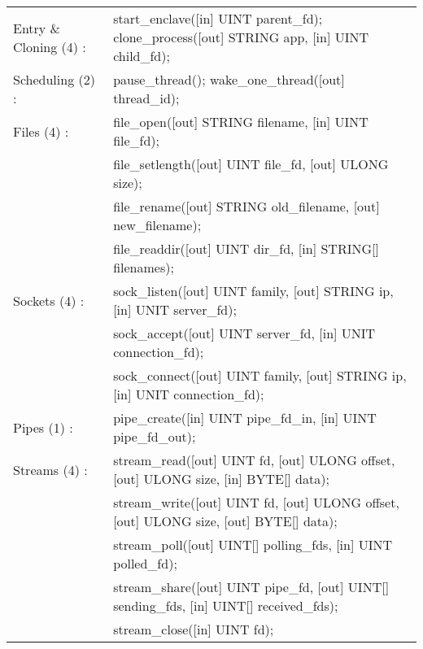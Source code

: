 \footnotesize
\begin{tabular}{>{\raggedleft\arraybackslash}p{.15\linewidth}>{\raggedright\arraybackslash\ttfamily}p{.85\linewidth}}
Entry \& Cloning (4) :
& start\_enclave([in] UINT parent\_fd); clone\_process([out] STRING app, [in] UINT child\_fd); \\
\addlinespace
Scheduling (2) :
& pause\_thread(); wake\_one\_thread([out] thread\_id); \\
\addlinespace
Files (4) :
& file\_open([out] STRING filename, [in] UINT file\_fd); \\
& file\_setlength([out] UINT file\_fd, [out] ULONG size); \\
& file\_rename([out] STRING old\_filename, [out] new\_filename); \\
& file\_readdir([out] UINT dir\_fd, [in] STRING[] filenames); \\
\addlinespace
Sockets (4) :
& sock\_listen([out] UINT family, [out] STRING ip, [in] UNIT server\_fd); \\
& sock\_accept([out] UINT server\_fd, [in] UNIT connection\_fd); \\
& sock\_connect([out] UINT family, [out] STRING ip, [in] UNIT connection\_fd); \\
\addlinespace
Pipes (1) :
& pipe\_create([in] UINT pipe\_fd\_in, [in] UINT pipe\_fd\_out); \\
\addlinespace
Streams (4) :
& stream\_read([out] UINT fd, [out] ULONG offset, [out] ULONG size, [in] BYTE[] data); \\
& stream\_write([out] UINT fd, [out] ULONG offset, [out] ULONG size, [out] BYTE[] data); \\
& stream\_poll([out] UINT[] polling\_fds, [in] UINT polled\_fd); \\
& stream\_share([out] UINT pipe\_fd, [out] UINT[] sending\_fds, [in] UINT[] received\_fds); \\
& stream\_close([in] UINT fd); \\
\end{tabular}
